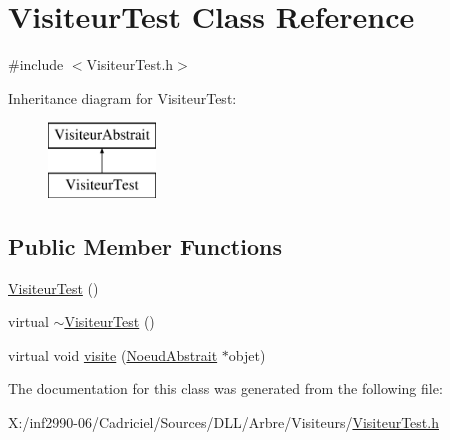 \hypertarget{class_visiteur_test}{\section{Visiteur\-Test Class Reference}
\label{class_visiteur_test}
}


{\ttfamily \#include $<$Visiteur\-Test.\-h$>$}

Inheritance diagram for Visiteur\-Test\-:\begin{figure}[H]
\begin{center}
\leavevmode
\includegraphics[height=2.000000cm]{class_visiteur_test}
\end{center}
\end{figure}
\subsection*{Public Member Functions}
\begin{DoxyCompactItemize}
\item 
\hyperlink{group__inf2990_ga23496d7b91a48dac6877c5fcf9c94f77}{Visiteur\-Test} ()
\item 
virtual \hyperlink{group__inf2990_ga3b89956917a41f6c2903923d394313f2}{$\sim$\-Visiteur\-Test} ()
\item 
virtual void \hyperlink{group__inf2990_ga6692440287f121399d334603dedf04f6}{visite} (\hyperlink{class_noeud_abstrait}{Noeud\-Abstrait} $\ast$objet)
\end{DoxyCompactItemize}


The documentation for this class was generated from the following file\-:\begin{DoxyCompactItemize}
\item 
X\-:/inf2990-\/06/\-Cadriciel/\-Sources/\-D\-L\-L/\-Arbre/\-Visiteurs/\hyperlink{_visiteur_test_8h}{Visiteur\-Test.\-h}\end{DoxyCompactItemize}
